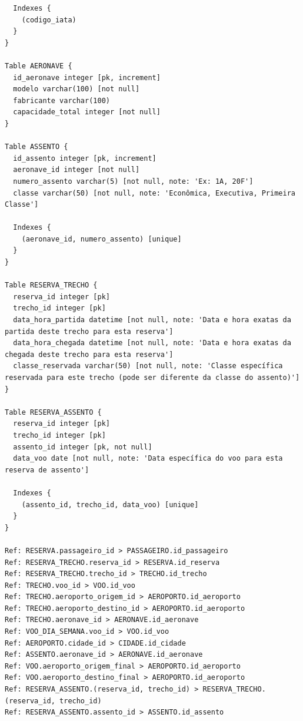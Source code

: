\begin{verbatim}
  Indexes {
    (codigo_iata)
  }
}

Table AERONAVE {
  id_aeronave integer [pk, increment]
  modelo varchar(100) [not null]
  fabricante varchar(100)
  capacidade_total integer [not null]
}

Table ASSENTO {
  id_assento integer [pk, increment]
  aeronave_id integer [not null]
  numero_assento varchar(5) [not null, note: 'Ex: 1A, 20F']
  classe varchar(50) [not null, note: 'Econômica, Executiva, Primeira Classe']

  Indexes {
    (aeronave_id, numero_assento) [unique]
  }
}

Table RESERVA_TRECHO {
  reserva_id integer [pk]
  trecho_id integer [pk]
  data_hora_partida datetime [not null, note: 'Data e hora exatas da partida deste trecho para esta reserva']
  data_hora_chegada datetime [not null, note: 'Data e hora exatas da chegada deste trecho para esta reserva']
  classe_reservada varchar(50) [not null, note: 'Classe específica reservada para este trecho (pode ser diferente da classe do assento)']
}

Table RESERVA_ASSENTO {
  reserva_id integer [pk]
  trecho_id integer [pk]
  assento_id integer [pk, not null]
  data_voo date [not null, note: 'Data específica do voo para esta reserva de assento']

  Indexes {
    (assento_id, trecho_id, data_voo) [unique]
  }
}

Ref: RESERVA.passageiro_id > PASSAGEIRO.id_passageiro
Ref: RESERVA_TRECHO.reserva_id > RESERVA.id_reserva
Ref: RESERVA_TRECHO.trecho_id > TRECHO.id_trecho
Ref: TRECHO.voo_id > VOO.id_voo
Ref: TRECHO.aeroporto_origem_id > AEROPORTO.id_aeroporto
Ref: TRECHO.aeroporto_destino_id > AEROPORTO.id_aeroporto
Ref: TRECHO.aeronave_id > AERONAVE.id_aeronave
Ref: VOO_DIA_SEMANA.voo_id > VOO.id_voo
Ref: AEROPORTO.cidade_id > CIDADE.id_cidade
Ref: ASSENTO.aeronave_id > AERONAVE.id_aeronave
Ref: VOO.aeroporto_origem_final > AEROPORTO.id_aeroporto
Ref: VOO.aeroporto_destino_final > AEROPORTO.id_aeroporto
Ref: RESERVA_ASSENTO.(reserva_id, trecho_id) > RESERVA_TRECHO.(reserva_id, trecho_id)
Ref: RESERVA_ASSENTO.assento_id > ASSENTO.id_assento
\end{verbatim}


